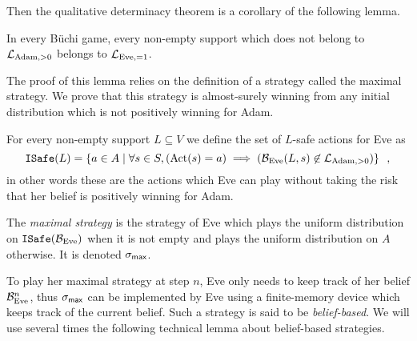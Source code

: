 Then the qualitative determinacy theorem is a corollary of the following lemma.
\begin{lemma}
In every B{\"u}chi game, every non-empty support
which does not belong to $\mathcal{L}_{\text{Adam},>0}$ belongs to $\mathcal{L}_{\text{Eve},=1}$.
\end{lemma}

The proof of this lemma relies on the definition of a strategy
called the maximal strategy.
We prove that this strategy is almost-surely winning from any initial
distribution which is not positively winning for Adam. 

\begin{definition}
\label{8-def:maximalstrategy}
For every non-empty support $L\subseteq V$ we define
 the set  of {$L$-safe} actions for Eve as
\[
{\tt ISafe}(L) = \left\{ a \in A \mid  \forall s \in S, (\text{Act}(s)=a) \implies (\mathcal{B}_{\text{Eve}}(L,s)\not\in\mathcal{L}_{\text{Adam},>0}
  )\right\}\enspace,
\]
in other words these are the actions which Eve can play without taking the risk
that her belief is positively winning for Adam.

The \emph{maximal strategy} is the strategy of Eve
which plays the uniform distribution
on ${\tt ISafe}(\mathcal{B}_{\text{Eve}})$
when it is not empty and plays the uniform distribution on $A$ otherwise.
It is denoted $\sigma_{\textsf{max}}$.

\end{definition}

To play her maximal strategy at step $n$,
Eve only needs to keep track of her belief $\mathcal{B}_{\text{Eve}}^n$,
thus $\sigma_{\textsf{max}}$ can be implemented by Eve 
using a finite-memory device which keeps track of the current belief.
Such a strategy is said to be \emph{belief-based}.
We will use several times  the following technical lemma about belief-based strategies.

